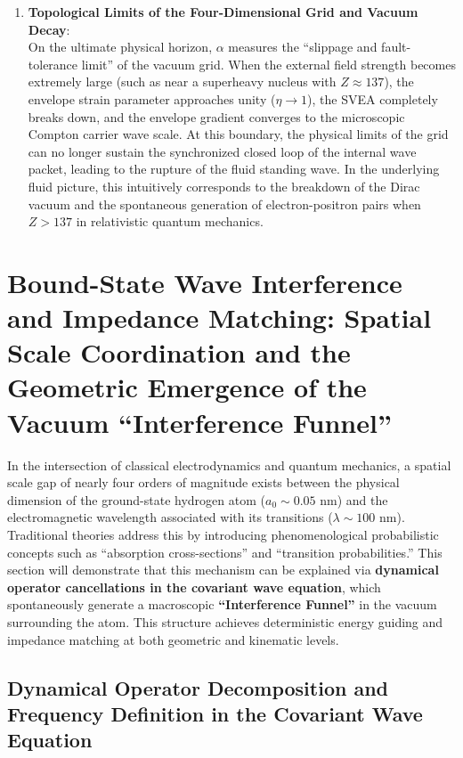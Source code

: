\documentclass[12pt, a4paper]{article}
\begin{document}
\begin{enumerate}
    \item \textbf{Topological Limits of the Four-Dimensional Grid and Vacuum Decay}: \\
    On the ultimate physical horizon, $\alpha$ measures the ``slippage and fault-tolerance limit'' of the vacuum grid. When the external field strength becomes extremely large (such as near a superheavy nucleus with $Z \approx 137$), the envelope strain parameter approaches unity ($\eta \to 1$), the SVEA completely breaks down, and the envelope gradient converges to the microscopic Compton carrier wave scale. At this boundary, the physical limits of the grid can no longer sustain the synchronized closed loop of the internal wave packet, leading to the rupture of the fluid standing wave. In the underlying fluid picture, this intuitively corresponds to the breakdown of the Dirac vacuum and the spontaneous generation of electron-positron pairs when $Z > 137$ in relativistic quantum mechanics.
\end{enumerate}

\section{Bound-State Wave Interference and Impedance Matching: Spatial Scale Coordination and the Geometric Emergence of the Vacuum ``Interference Funnel''}

In the intersection of classical electrodynamics and quantum mechanics, a spatial scale gap of nearly four orders of magnitude exists between the physical dimension of the ground-state hydrogen atom ($a_0 \sim 0.05 \text{ nm}$) and the electromagnetic wavelength associated with its transitions ($\lambda \sim 100 \text{ nm}$). Traditional theories address this by introducing phenomenological probabilistic concepts such as ``absorption cross-sections'' and ``transition probabilities.'' This section will demonstrate that this mechanism can be explained via \textbf{dynamical operator cancellations in the covariant wave equation}, which spontaneously generate a macroscopic \textbf{``Interference Funnel''} in the vacuum surrounding the atom. This structure achieves deterministic energy guiding and impedance matching at both geometric and kinematic levels.

\subsection{Dynamical Operator Decomposition and Frequency Definition in the Covariant Wave Equation}
\end{document}
